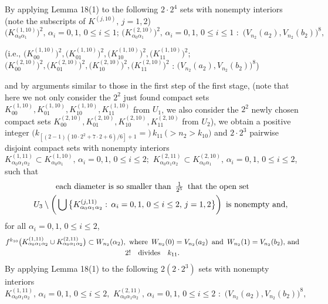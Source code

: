 \documentclass[12pt]{article}
\newcommand{\al}{\alpha}
\begin{document}
By applying Lemma 18(1) to the following $2 \cdot 2^4$ sets with nonempty interiors \big(note the subscripts of $K^{(j,10)}, \, j= 1, 2$\big)
$$
\big(K_{\al_0\al_1}^{(1,10)}\big)^2, \, \al_i = 0, 1, \, 0 \le i \le 1; \, \big(K_{\al_0\al_1}^{(2,10)}\big)^2, \, \al_i = 0, 1, \, 0 \le i \le 1 \,\, : \,\, \big(V_{n_2}(a_2), V_{n_2}(b_2)\big)^8,
$$
\begin{footnotesize}
\big(i.e., $\big(K_{00}^{(1,10)}\big)^2, \big(K_{01}^{(1,10)}\big)^2, \big(K_{10}^{(1,10)}\big)^2, \big(K_{11}^{(1,10)}\big)^2$; $\big(K_{00}^{(2,10)}\big)^2, \big(K_{01}^{(2,10)}\big)^2, \big(K_{10}^{(2,10)}\big)^2, \big(K_{11}^{(2,10)}\big)^2$ : $\big(V_{n_2}(a_2), V_{n_2}(b_2)\big)^8$\big)
\end{footnotesize}
and by arguments similar to those in the first step of the first stage, \big(note that here we not only consider the $2^2$ just found compact sets $K_{00}^{(1,10)}, K_{01}^{(1,10)}, K_{10}^{(1,10)}, K_{11}^{(1,10)}$ from $U_1$, we also consider the $2^2$ newly chosen compact sets $K_{00}^{(2,10)}, K_{01}^{(2,10)}, K_{10}^{(2,10)}, K_{11}^{(2,10)}$ from $U_2$\big), we obtain a positive integer $\big(k_{[(2-1)(10 \cdot 2^2+7 \cdot 2+6)/6]+1} =) \, k_{11} \, (> n_2 > k_{10}\big)$ and $2 \cdot 2^3$ pairwise disjoint compact sets with nonempty interiors $K_{\al_0\al_1\al_2}^{(1,11)} \subset K_{\al_0\al_1}^{(1,10)}, \, \al_i = 0, 1, \, 0 \le i \le 2; \,\, K_{\al_0\al_1\al_2}^{(2,11)} \subset K_{\al_0\al_1}^{(2,10)}, \, \al_i = 0, 1, \, 0 \le i \le 2$, such that 
\begin{multline*}
$$
\text{each diameter is so smaller than} \,\,\, \frac 1{2^5} \,\,\, \text{that the open set} \\  \qquad U_3 \setminus \bigg( \bigcup \big\{ K_{\al_0\al_1\al_2}^{(j,11)}: \, \al_i = 0, 1, \, 0 \le i \le 2, \, j = 1, 2 \big\} \bigg) \,\,\, \text{is nonempty and},
$$
\end{multline*}
for all $\al_i = 0, 1, \, 0 \le i \le 2$, 
\begin{multline*}
$$
f^{k_{10}}\big(K_{\al_0\al_1\al_2}^{(1,11)} \cup K_{\al_0\al_1\al_2}^{(2,11)}\big) \subset W_{n_2}(\al_2), \,\, \text{where} \,\,\, W_{n_2}(0) = V_{n_2}(a_2) \,\,\, \text{and} \,\,\, W_{n_2}(1) = V_{n_2}(b_2), \, \text{and} \\
2! \quad \text{divides} \quad k_{11}. 
$$
\end{multline*}
\indent By applying Lemma 18(1) to the following $2(2 \cdot 2^3)$ sets with nonempty interiors 
$$
K_{\al_0\al_1\al_2}^{(1,11)}, \, \al_i = 0, 1, \, 0 \le i \le 2, \,\, K_{\al_0\al_1\al_2}^{(2,11)}, \, \al_i = 0, 1, \, 0 \le i \le 2 \,\, : \,\, \big(V_{n_2}(a_2), V_{n_2}(b_2)\big)^8,
$$
\end{document}
